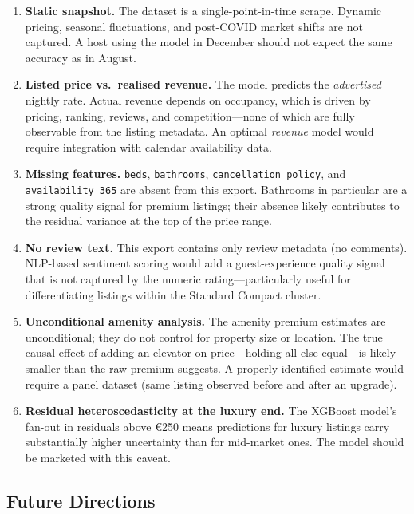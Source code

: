\documentclass[12pt, a4paper]{article}
\begin{document}
\begin{enumerate}[itemsep=5pt]
  \item \textbf{Static snapshot.} The dataset is a single-point-in-time scrape. Dynamic pricing, seasonal fluctuations, and post-COVID market shifts are not captured. A host using the model in December should not expect the same accuracy as in August.

  \item \textbf{Listed price vs.\ realised revenue.} The model predicts the \textit{advertised} nightly rate. Actual revenue depends on occupancy, which is driven by pricing, ranking, reviews, and competition---none of which are fully observable from the listing metadata. An optimal \textit{revenue} model would require integration with calendar availability data.

  \item \textbf{Missing features.} \texttt{beds}, \texttt{bathrooms}, \texttt{cancellation\_policy}, and \texttt{availability\_365} are absent from this export. Bathrooms in particular are a strong quality signal for premium listings; their absence likely contributes to the residual variance at the top of the price range.

  \item \textbf{No review text.} This export contains only review metadata (no comments). NLP-based sentiment scoring would add a guest-experience quality signal that is not captured by the numeric rating---particularly useful for differentiating listings within the Standard Compact cluster.

  \item \textbf{Unconditional amenity analysis.} The amenity premium estimates are unconditional; they do not control for property size or location. The true causal effect of adding an elevator on price---holding all else equal---is likely smaller than the raw premium suggests. A properly identified estimate would require a panel dataset (same listing observed before and after an upgrade).

  \item \textbf{Residual heteroscedasticity at the luxury end.} The XGBoost model's fan-out in residuals above \euro{}250 means predictions for luxury listings carry substantially higher uncertainty than for mid-market ones. The model should be marketed with this caveat.
\end{enumerate}

\subsection{Future Directions}
\end{document}
